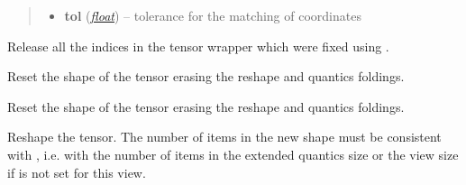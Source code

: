 \documentclass[a4paper,10pt,english]{sphinxmanual}
\begin{document}
\begin{fulllineitems}
\begin{fulllineitems}
\begin{quote}
\begin{description}
\begin{itemize}
\item {} 
\textbf{tol} (\href{http://docs.python.org/library/functions.html\#float}{\emph{float}}) -- tolerance for the matching of coordinates

\end{itemize}

\end{description}\end{quote}

\end{fulllineitems}


\begin{fulllineitems}
\label{api-tw:TensorToolbox.core.TensorWrapper.release_indices}
Release all the indices in the tensor wrapper which were fixed using .

\end{fulllineitems}


\begin{fulllineitems}
\label{api-tw:TensorToolbox.core.TensorWrapper.reset_ghost_shape}
Reset the shape of the tensor erasing the reshape and quantics foldings.

\end{fulllineitems}


\begin{fulllineitems}
\label{api-tw:TensorToolbox.core.TensorWrapper.reset_shape}
Reset the shape of the tensor erasing the reshape and quantics foldings.

\end{fulllineitems}


\begin{fulllineitems}
\label{api-tw:TensorToolbox.core.TensorWrapper.reshape}
Reshape the tensor. The number of items in the new shape must be consistent with , i.e. with the number of items in the extended quantics size or the view size if  is not set for this view.


\end{fulllineitems}
\end{fulllineitems}
\end{document}
